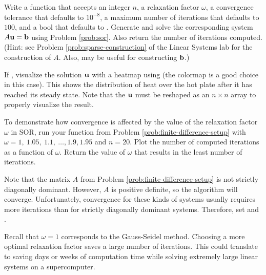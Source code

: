\begin{problem}
Write a function that accepts an integer $n$, a relaxation factor $\omega$, a convergence tolerance  that defaults to $10^{-8}$, a maximum number of iterations  that defaults to $100$, and a bool  that defaults to .
Generate and solve the corresponding system $A\mathbf{u} = \mathbf{b}$ using Problem \ref{prob:sor}.
Also return the number of iterations computed.
\\ (Hint: see Problem \ref{prob:sparse-construction} of the Linear Systems lab for the construction of $A$.
Also,  may be useful for constructing $\mathbf{b}$.)

If , visualize the solution $\mathbf{u}$ with a heatmap using  (the colormap  is a good choice in this case).
This shows the distribution of heat over the hot plate after it has reached its steady state.
Note that the $\mathbf{u}$ must be reshaped as an $n\times n$ array to properly visualize the result.
\label{prob:finite-difference-setup}
\end{problem}

\begin{problem}
To demonstrate how convergence is affected by the value of the relaxation factor $\omega$ in SOR, run your function from Problem \ref{prob:finite-difference-setup} with $\omega = 1,\ 1.05,\ 1.1,\ \dots , 1.9, 1.95$ and $n = 20$.
Plot the number of computed iterations as a function of $\omega$.
Return the value of $\omega$ that results in the least number of iterations.

Note that the matrix $A$ from Problem \ref{prob:finite-difference-setup} is not strictly diagonally dominant.
However, $A$ is positive definite, so the algorithm will converge.
Unfortunately, convergence for these kinds of systems usually requires more iterations than for strictly diagonally dominant systems.
Therefore, set  and .

Recall that $\omega = 1$ corresponds to the Gauss-Seidel method.
Choosing a more optimal relaxation factor saves a large number of iterations.
This could translate to saving days or weeks of computation time while solving extremely large linear systems on a supercomputer.
\end{problem}

\begin{comment}
The following code generates a heatmap to help you visualize the steady-state heat flow across the interior of the plate:

\begin{lstlisting}
from matplotlib import pyplot as plt
import numpy as np

n = 100
A,b = finite_difference(n)
x = sparse_sor(A,b,1.9,maxiters=10000,tol=10**-2)
U = x.reshape((n,n))
x,y = np.linspace(0,10,n), np.linspace(0,10,n)
X,Y = np.meshgrid(x,y)

plt.pcolormesh(X,Y,U,cmap='coolwarm')
plt.show()
\end{lstlisting}
\end{comment}

